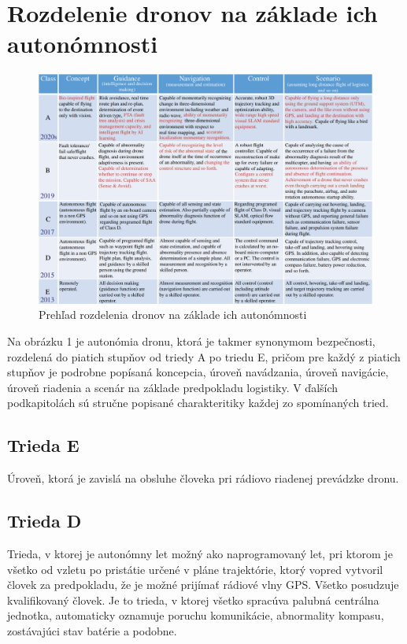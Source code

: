 \documentclass[10pt,twoside,slovak,a4paper]{article}
\begin{document}
\section{Rozdelenie dronov na základe ich autonómnosti}
\begin{figure}[h]
	\label{fig:model1}
	\includegraphics[width=\linewidth]{tabulka.png}
	\caption{Prehľad rozdelenia dronov na základe ich autonómnosti \cite{sanchez2017multi}}
\end{figure}
Na obrázku 1 je autonómia dronu, ktorá je takmer synonymom bezpečnosti, rozdelená do piatich stupňov od triedy A po triedu E, pričom pre každý z piatich stupňov je podrobne popísaná koncepcia, úroveň navádzania, úroveň navigácie, úroveň riadenia a scenár na základe predpokladu logistiky. \cite{sanchez2017multi} V ďalších podkapitolách sú stručne popisané charakteritiky každej zo spomínaných tried. 

\subsection{Trieda E}
Úroveň, ktorá je zavislá na obsluhe človeka pri rádiovo riadenej prevádzke dronu. \cite{nonami2020present}

\subsection{Trieda D}
Trieda, v ktorej je autonómny let možný ako naprogramovaný let, pri ktorom je všetko od vzletu po pristátie určené v pláne trajektórie, ktorý vopred vytvoril človek za predpokladu, že je možné prijímať rádiové vlny GPS. Všetko posudzuje kvalifikovaný človek. Je to trieda, v ktorej všetko spracúva palubná centrálna jednotka, automaticky oznamuje poruchu komunikácie, abnormality kompasu, zostávajúci stav batérie a podobne. \cite{nonami2020present}
\end{document}
